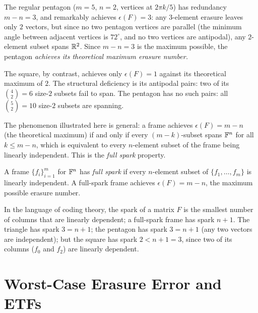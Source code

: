 \begin{examplebox}[title={Example 10.2: Pentagon and the role of equiangularity}]
\label{ex:pentagon-erasure}
The regular pentagon ($m=5$, $n=2$, vertices at $2\pi k/5$) has
redundancy $m-n=3$, and remarkably achieves $\epsilon(F)=3$: any
$3$-element erasure leaves only $2$ vectors, but since no two pentagon
vertices are parallel (the minimum angle between adjacent vertices is
$72^\circ$, and no two vertices are antipodal), any $2$-element subset
spans $\mathbb{R}^2$. Since $m-n=3$ is the maximum possible, the pentagon
\emph{achieves its theoretical maximum erasure number.}

The square, by contrast, achieves only $\epsilon(F)=1$ against its
theoretical maximum of $2$. The structural deficiency is its antipodal
pairs: two of its $\binom{4}{2}=6$ size-$2$ subsets fail to span.
The pentagon has no such pairs: all $\binom{5}{2}=10$ size-$2$
subsets are spanning.
\end{examplebox}

\begin{remark*}
The phenomenon illustrated here is general: a frame achieves
$\epsilon(F)=m-n$ (the theoretical maximum) if and only if every
$(m-k)$-subset spans $\mathbb{F}^n$ for all $k\le m-n$, which is equivalent to
every $n$-element subset of the frame being linearly independent. This
is the \emph{full spark} property.
\end{remark*}

\begin{definition}
\label{def:full-spark}
A frame $\{f_i\}_{i=1}^m$ for $\mathbb{F}^n$ has \emph{full spark} if every
$n$-element subset of $\{f_1,\ldots,f_m\}$ is linearly independent. A
full-spark frame achieves $\epsilon(F)=m-n$, the maximum possible
erasure number.
\end{definition}

\begin{remark*}
In the language of coding theory, the spark of a matrix $F$ is the
smallest number of columns that are linearly dependent; a full-spark
frame has spark $n+1$. The triangle has spark $3=n+1$; the pentagon has
spark $3=n+1$ (any two vectors are independent); but the square has
spark $2<n+1=3$, since two of its columns ($f_0$ and $f_2$) are linearly
dependent.
\end{remark*}

\section{Worst-Case Erasure Error and ETFs}
\label{sec:worst-case-etf}

